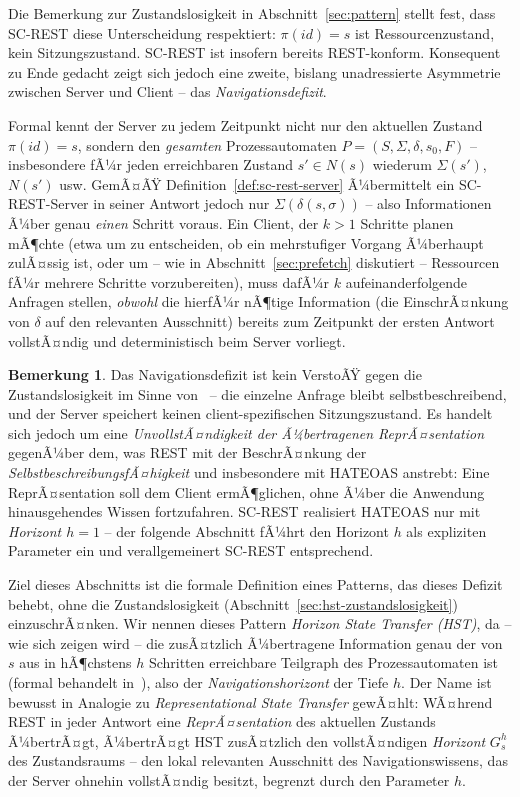 ﻿\documentclass[a4paper,12pt]{article}
\theoremstyle{definition}
\newtheorem{bemerkung}{Bemerkung}
\begin{document}
Die Bemerkung zur Zustandslosigkeit in Abschnitt~\ref{sec:pattern} stellt fest, dass
SC-REST diese Unterscheidung respektiert: $\pi(id)=s$ ist Ressourcenzustand, kein
Sitzungszustand. SC-REST ist insofern bereits REST-konform. Konsequent zu Ende gedacht
zeigt sich jedoch eine zweite, bislang unadressierte Asymmetrie zwischen Server und
Client -- das \emph{Navigationsdefizit}.

Formal kennt der Server zu jedem Zeitpunkt nicht nur den aktuellen Zustand
$\pi(id)=s$, sondern den \emph{gesamten} Prozessautomaten
$P=(S,\Sigma,\delta,s_0,F)$ -- insbesondere fÃ¼r jeden erreichbaren Zustand $s'\in N(s)$
wiederum $\Sigma(s')$, $N(s')$ usw. GemÃ¤ÃŸ Definition~\ref{def:sc-rest-server} Ã¼bermittelt
ein SC-REST-Server in seiner Antwort jedoch nur $\Sigma(\delta(s,\sigma))$ -- also
Informationen Ã¼ber genau \emph{einen} Schritt voraus. Ein Client, der $k>1$ Schritte
planen mÃ¶chte (etwa um zu entscheiden, ob ein mehrstufiger Vorgang Ã¼berhaupt zulÃ¤ssig
ist, oder um -- wie in Abschnitt~\ref{sec:prefetch} diskutiert -- Ressourcen fÃ¼r mehrere
Schritte vorzubereiten), muss dafÃ¼r $k$ aufeinanderfolgende Anfragen stellen,
\emph{obwohl} die hierfÃ¼r nÃ¶tige Information (die EinschrÃ¤nkung von $\delta$ auf den
relevanten Ausschnitt) bereits zum Zeitpunkt der ersten Antwort vollstÃ¤ndig und
deterministisch beim Server vorliegt.

\begin{bemerkung}
	\label{bem:navigationsdefizit}
	Das Navigationsdefizit ist kein VerstoÃŸ gegen die Zustandslosigkeit im Sinne
	von~\cite{fielding2000} -- die einzelne Anfrage bleibt selbstbeschreibend, und der
	Server speichert keinen client-spezifischen Sitzungszustand. Es handelt sich jedoch
	um eine \emph{UnvollstÃ¤ndigkeit der Ã¼bertragenen ReprÃ¤sentation} gegenÃ¼ber dem, was
	REST mit der BeschrÃ¤nkung der \emph{SelbstbeschreibungsfÃ¤higkeit} und insbesondere
	mit HATEOAS anstrebt: Eine ReprÃ¤sentation soll dem Client ermÃ¶glichen, ohne Ã¼ber die
	Anwendung hinausgehendes Wissen fortzufahren. SC-REST realisiert HATEOAS nur mit
	\emph{Horizont $h=1$} -- der folgende Abschnitt fÃ¼hrt den Horizont $h$ als expliziten
	Parameter ein und verallgemeinert SC-REST entsprechend.
\end{bemerkung}

Ziel dieses Abschnitts ist die formale Definition eines Patterns, das dieses Defizit
behebt, ohne die Zustandslosigkeit (Abschnitt~\ref{sec:hst-zustandslosigkeit})
einzuschrÃ¤nken. Wir nennen dieses Pattern \emph{Horizon State Transfer (HST)}, da --
wie sich zeigen wird -- die zusÃ¤tzlich Ã¼bertragene Information genau der von $s$ aus in
hÃ¶chstens $h$ Schritten erreichbare Teilgraph des Prozessautomaten ist
(formal behandelt in~\cite{epp2026subgraph}), also der \emph{Navigationshorizont} der
Tiefe $h$. Der Name ist bewusst in Analogie zu \emph{Representational State Transfer}
gewÃ¤hlt: WÃ¤hrend REST in jeder Antwort eine \emph{ReprÃ¤sentation} des aktuellen Zustands
Ã¼bertrÃ¤gt, Ã¼bertrÃ¤gt HST zusÃ¤tzlich den vollstÃ¤ndigen \emph{Horizont} $G_s^h$ des
Zustandsraums -- den lokal relevanten Ausschnitt des Navigationswissens, das der Server
ohnehin vollstÃ¤ndig besitzt, begrenzt durch den Parameter $h$.
\end{document}
